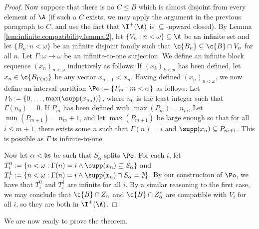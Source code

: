 \documentclass[11pt,reqno]{amsart}
\begin{document}
\begin{proof}
    Now suppose that there is no $C \leq B$ which is almost disjoint from every element of $\A$ (if such a $C$ exists, we may apply the argument in the previous paragraph to $C$, and use the fact that $\I^+(\A)$ is $\subseteq$-upward closed). By Lemma \ref{lem:infinite.compatibility.lemma.2}, let $\{V_n : n < \omega\} \subseteq \A$ be an infinite set and let $\{B_n : n < \omega\}$ be an infinite disjoint family such that $\c{B_n} \subseteq \c{B} \cap V_n$ for all $n$. Let $\Gamma : \omega \to \omega$ be an infinite-to-one surjection. We define an infinite block sequence $(x_n)_{n<\omega}$ inductively as follows: If $(x_k)_{k<n}$ has been defined, let $x_n \in \c{B_{\Gamma(n)}}$ be any vector $x_{n-1} < x_n$. Having defined $(x_n)_{n<\omega}$, we now define an interval partition $\Po := \{P_m : m < \omega\}$ as follows: Let $P_0 := \{0,\dots,\max(\supp(x_{n_0}))\}$, where $n_0$ is the least integer such that $\Gamma(n_0) = 0$. If $P_m$ has been defined with $\max(P_m) = n_m$, Let $\min(P_{m+1}) = n_m + 1$, and let $\max(P_{m+1})$ be large enough so that for all $i \leq m+1$, there exists some $n$ such that $\Gamma(n) = i$ and $\supp(x_n) \subseteq P_{m+1}$. This is possible as $\Gamma$ is infinite-to-one. 

    Now let $\alpha < \frak{bs}$ be such that $S_\alpha$ splits $\Po$. For each $i$, let $T_i^0 := \{n < \omega : \Gamma(n) = i \wedge \supp(x_n) \subseteq S_\alpha\}$ and $T_i^1 := \{n < \omega : \Gamma(n) = i \wedge \supp(x_n) \cap S_\alpha = \emptyset\}$. By our construction of $\Po$, we have that $T_i^0$ and $T_i^1$ are infinite for all $i$. By a similar reasoning to the first case, we may conclude that $\c{B} \cap Z_\alpha$ and $\c{B} \cap Z_\alpha^c$ are compatible with $V_i$ for all $i$, so they are both in $\I^+(\A)$.
\end{proof}

We are now ready to prove the theorem.
\end{document}
